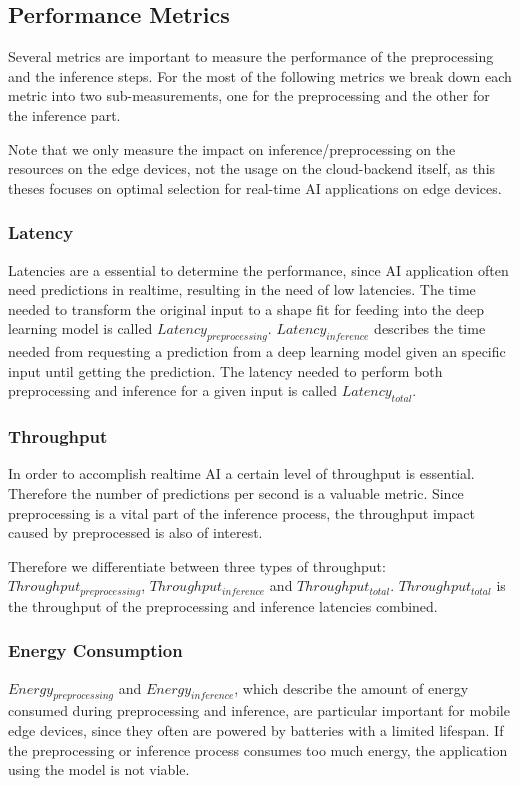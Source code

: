 \subsection{Performance Metrics}
\label{chap:metrics}
Several metrics are important to measure the performance of the preprocessing and the inference steps. For the most of the following metrics we break down each metric into two sub-measurements, one for the preprocessing  and the other for the inference part.

Note that we only measure the impact on inference/preprocessing on the resources on the edge devices, not the usage on the cloud-backend itself, as this theses focuses on optimal selection for real-time AI applications on edge devices.
\subsubsection{Latency}
Latencies are a essential to determine the performance, since AI application often need predictions in realtime, resulting in the need of low latencies.
The time needed to transform the original input to a shape fit for feeding into the deep learning model is called $Latency_{preprocessing}$.
$Latency_{inference}$ describes the time needed from requesting a prediction from a deep learning model given an specific input until getting the prediction.
The latency needed to perform both preprocessing and inference for a given input is called $Latency_{total}$.
\subsubsection{Throughput}
In order to accomplish realtime AI a certain level of throughput is essential. Therefore the number of predictions per second is a valuable metric. 
Since preprocessing is a vital part of the inference process, the throughput impact caused by preprocessed is also of interest.

Therefore we differentiate between three types of throughput: $Throughput_{preprocessing}$, $Throughput_{inference}$ and $Throughput_{total}$.
$Throughput_{total}$ is the throughput of the preprocessing and inference latencies combined.



\subsubsection{Energy Consumption}
$Energy_{preprocessing}$ and $Energy_{inference}$, which describe the amount of energy consumed during preprocessing and inference, are particular important for mobile edge devices, since they often are powered by batteries with a limited lifespan. If the preprocessing or inference process consumes too much energy, the application using the model is not viable.


